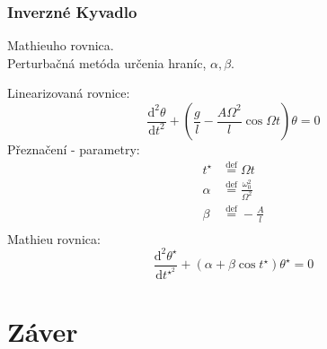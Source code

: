 \documentclass{beamer}
\begin{document}
\begin{frame}

\frametitle{Inverzné Kyvadlo}
\begin{center}
Mathieuho rovnica.\\
Perturbačná metóda určenia hraníc, $\alpha, \beta$.\\
\end{center}

\begin{small}
Linearizovaná rovnice:
\begin{equation*}
\frac{\mathrm{d}^{2}\theta}{\mathrm{d} t^{2}}+\left(  \frac{g}{l}-\frac{A \Omega^{2}}{l} \cos \Omega t \right)   \theta =0
\end{equation*}
Přeznačení - parametry:
\begin{align*}
t^{\star} & \stackrel{\text{def}}{=} \Omega t \\
\alpha & \stackrel{\text{def}}{=} \frac{\omega^{2}_{0}}{\Omega^{2}} \\
\beta & \stackrel{\text{def}}{=} -\frac{A}{l} \\
\end{align*}
Mathieu rovnica:
\begin{equation*}
\frac{\mathrm{d}^{2}\theta^{\star}}{\mathrm{d} t^{\star}^{2}}+\left( \alpha + \beta \cos t^{\star} \right)   \theta^{\star} =0
\end{equation*}

\end{small}



\end{frame}
 

\section*{Záver}
\label{sec:Záver}
\end{document}
